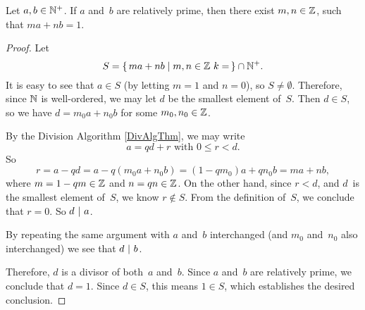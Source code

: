 \documentclass[../MATH-2000-Notes.tex]{subfiles}
\begin{document}
\begin{Theorem}
    {}
    \label{GCDLinComb}
    Let $a,b \in \mathbb{N}^+$. If $a$ and~$b$ are relatively prime, then there exist $m,n \in \mathbb{Z}$, such that $ma + nb = 1$.
\end{Theorem}

\begin{proof}
    Let
        $$ S = \{\, ma + nb \mid m,n \in \mathbb{Z}\ k =  \,\} \cap \mathbb{N}^+. $$
    It is easy to see that $a \in S$ (by letting $m = 1$ and $n = 0$), so $S \neq \emptyset$. Therefore, since $\mathbb{N}$ is well-ordered, we may let $d$ be the smallest element of~$S$.
    Then $d \in S$, so we have $d = m_0 a + n_0 b$ for some $m_0,n_0 \in \mathbb{Z}$.
    
    By the Division Algorithm \ref{DivAlgThm}, we may write 
        $$ \text{$a = qd + r$ with $0 \le r < d$} .$$
    So
        $$ r = a - qd = a - q(m_0a+n_0b) = (1-qm_0)a + qn_0b = m a + n b ,$$
    where $m = 1 - qm \in \mathbb{Z}$ and $n = qn \in \mathbb{Z}$.
    On the other hand, since $r < d$, and $d$~is the smallest element of~$S$, we know $r \notin S$. 
     From the definition of~$S$, we conclude that $r = 0$. So $d \ |\  a$.
    
    By repeating the same argument with $a$ and~$b$ interchanged (and $m_0$ and~$n_0$ also interchanged) we see that $d \ |\  b$. 
    
    Therefore, $d$ is a divisor of both~$a$ and~$b$. Since $a$ and~$b$ are relatively prime, we conclude that $d = 1$. Since $d \in S$, this means $1 \in S$, which establishes the desired conclusion.
\end{proof}
\end{document}
